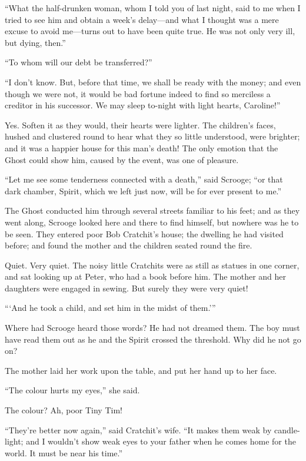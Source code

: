 \documentclass[paper=a5,BCOR=15mm,twoside,DIV=15,headinclude=off,12pt,chapterprefix=off,openany,headings=huge]{scrbook} %
\begin{document}
\enquote{What the half-drunken woman, whom I told you of last night, said to me when I tried to see him and obtain a week's delay—and what I thought was a mere excuse to avoid me—turns out to have been quite true. He was not only very ill, but dying, then.}

\enquote{To whom will our debt be transferred?}

\enquote{I don't know. But, before that time, we shall be ready with the money; and even though we were not, it would be bad fortune indeed to find so merciless a creditor in his successor. We may sleep to-night with light hearts, Caroline!}

Yes. Soften it as they would, their hearts were lighter. The children's faces, hushed and clustered round to hear what they so little understood, were brighter; and it was a happier house for this man's death! The only emotion that the Ghost could show him, caused by the event, was one of pleasure.

\enquote{Let me see some tenderness connected with a death,} said Scrooge; \enquote{or that dark chamber, Spirit, which we left just now, will be for ever present to me.}

The Ghost conducted him through several streets familiar to his feet; and as they went along, Scrooge looked here and there to find himself, but nowhere was he to be seen. They entered poor Bob Cratchit's house; the dwelling he had visited before; and found the mother and the children seated round the fire.

Quiet. Very quiet. The noisy little Cratchits were as still as statues in one corner, and sat looking up at Peter, who had a book before him. The mother and her daughters were engaged in sewing. But surely they were very quiet!

\enquote{\enquote{And he took a child, and set him in the midst of them.}}

Where had Scrooge heard those words? He had not dreamed them. The boy must have read them out as he and the Spirit crossed the threshold. Why did he not go on?

The mother laid her work upon the table, and put her hand up to her face.

\enquote{The colour hurts my eyes,} she said.

The colour? Ah, poor Tiny Tim!

\enquote{They're better now again,} said Cratchit's wife. \enquote{It makes them weak by candle-light; and I wouldn't show weak eyes to your father when he comes home for the world. It must be near his time.}
\end{document}
